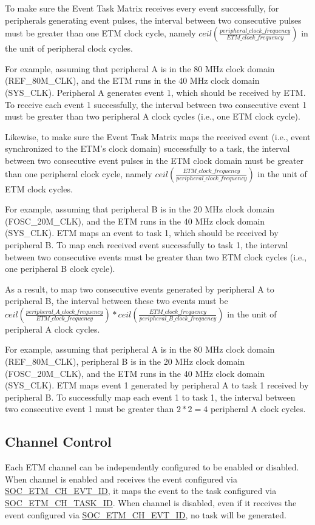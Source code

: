 \documentclass[main\_\_EN.tex]{subfiles}
\begin{document}
To make sure the Event Task Matrix receives every event successfully, for peripherals generating event pulses, the interval between two consecutive pulses must be greater than one ETM clock cycle, namely $ceil(\frac{peripheral\_clock\_frequency}{ETM\_clock\_frequency})$ in the unit of peripheral clock cycles.

For example, assuming that peripheral A is in the 80 MHz clock domain (REF\_80M\_CLK), and the ETM runs in the 40 MHz clock domain (SYS\_CLK). Peripheral A generates event 1, which should be received by ETM. To receive each event 1 successfully, the interval between two consecutive event 1 must be greater than two peripheral A clock cycles (i.e., one ETM clock cycle).

Likewise, to make sure the Event Task Matrix maps the received event (i.e., event synchronized to the ETM's clock domain) successfully to a task, the interval between two consecutive event pulses in the ETM clock domain must be greater than one peripheral clock cycle, namely $ceil(\frac{ETM\_clock\_frequency}{peripheral\_clock\_frequency})$ in the unit of ETM clock cycles.

For example, assuming that peripheral B is in the 20 MHz clock domain (FOSC\_20M\_CLK), and the ETM runs in the 40 MHz clock domain (SYS\_CLK). ETM maps an event to task 1, which should be received by peripheral B. To map each received event successfully to task 1, the interval between two consecutive events must be greater than two ETM clock cycles (i.e., one peripheral B clock cycle).

As a result, to map two consecutive events generated by peripheral A to peripheral B, the interval between these two events must be $ceil(\frac{peripheral\_A\_clock\_frequency}{ETM\_clock\_frequency})*ceil(\frac{ETM\_clock\_frequency}{peripheral\_B\_clock\_frequency})$ in the unit of peripheral A clock cycles.

For example, assuming that peripheral A is in the 80 MHz clock domain (REF\_80M\_CLK), peripheral B is in the 20 MHz clock domain (FOSC\_20M\_CLK), and the ETM runs in the 40 MHz clock domain (SYS\_CLK). ETM maps event 1 generated by peripheral A to task 1 received by peripheral B. To successfully map each event 1 to task 1, the interval between two consecutive event 1 must be greater than $2*2=4$ peripheral A clock cycles.


\subsection{Channel Control}
\label{sec:evntaskmatrix-channel-enable}
Each ETM channel can be independently configured to be enabled or disabled. When channel is enabled and receives the event configured via \hyperref[fielddesc:SOCETMCH0EVTID]{SOC\_ETM\_CH\_EVT\_ID}, it maps the event to the task configured via \hyperref[fielddesc:SOCETMCH0TASKID]{SOC\_ETM\_CH\_TASK\_ID}. When channel is disabled, even if it receives the event configured via \hyperref[fielddesc:SOCETMCH0EVTID]{SOC\_ETM\_CH\_EVT\_ID}, no task will be generated.
\end{document}
